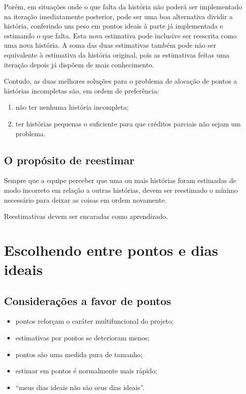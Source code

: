 \documentclass[a4paper,abntfigtabnum,noindentfirst]{abnt}
\begin{document}
Porém, em situações onde o que falta da história não poderá ser implementado na iteração imediatamente posterior, pode ser uma boa alternativa dividir a história, conferindo um peso em pontos ideais à parte já implementada e estimando o que falta. Esta nova estimativa pode inclusive ser reescrita como uma nova história. A soma das duas estimativas também pode não ser equivalente à estimativa da história original, pois as estimativas feitas uma iteração depois já dispõem de mais conhecimento.

Contudo, as duas melhores soluções para o problema de alocação de pontos a histórias incompletas são, em ordem de preferência:
\begin{enumerate}
\item não ter nenhuma história incompleta;
\item ter histórias pequenas o suficiente para que créditos parciais não sejam um problema.
\end{enumerate}


\section{O propósito de reestimar}

Sempre que a equipe perceber que uma ou mais histórias foram estimadas de modo incorreto em relação a outras histórias, devem ser reestimado o mínimo necessário para deixar as coisas em ordem novamente.

Reestimativas devem ser encaradas como aprendizado.



\chapter{Escolhendo entre pontos e dias ideais}

\section{Considerações a favor de pontos}

\begin{itemize}
\item pontos reforçam o caráter multifuncional do projeto;
\item estimativas por pontos se deterioram menos;
\item pontos são uma medida pura de tamanho;
\item estimar em pontos é normalmente mais rápido;
\item ``meus dias ideais não são seus dias ideais''.
\end{itemize}
\end{document}

